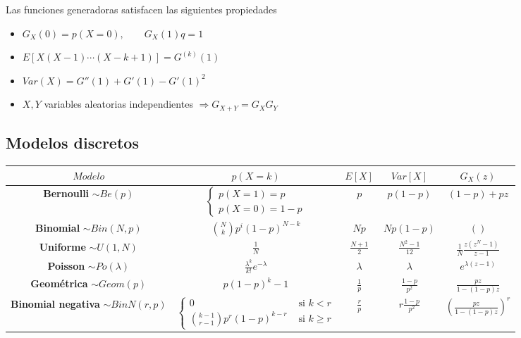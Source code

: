 \documentclass[leqno]{article}
\begin{document}
Las funciones generadoras satisfacen las siguientes propiedades
\begin{itemize}[topsep=-6pt, itemsep=0pt]
  \item $G_X(0) = p(X=0), \qquad G_X(1)q = 1$
  \item $E[X(X-1)\cdots (X-k+1)] =G^{(k)}(1)$ 
  \item $Var(X) = G''(1)+G'(1)-G'(1)^2$ 
  \item $X, Y$ variables aleatorias independientes  $\Rightarrow G_{X+Y} = G_XG_Y$
\end{itemize}

\subsection{Modelos discretos}
\begin{center}
\begin{tabular}{|c|c|c|c|c|}
\hline
$Modelo$ &  $p(X=k)$ &  $E[X]$ &  $Var[X]$ &  $G_X(z)$ \\
\hline
\makecell{\textbf{Bernoulli}\\ $\sim Be(p)$ }  & $\begin{cases}  p(X=1)=p \\  p(X=0) = 1-p \end{cases}$ & $p$ &  $p(1-p)$ &  $(1-p) + pz$ \\
\hline
\makecell{\textbf{Binomial}\\ $\sim Bin(N, p)$} & $\displaystyle\binom{N}{k}p^i(1-p)^{N-k}$ & $Np$ &  $Np(1-p)$ &  $()$ \\
\hline
\makecell{\textbf{Uniforme} \\ $\sim U(1, N)$} &  $\displaystyle\frac{1}{N}$ & $\displaystyle\frac{N+1}{2}$ & $\displaystyle\frac{N^2-1}{12}$ & $\displaystyle\frac{1}{N} \frac{z(z^N-1)}{z-1}$ \\
\hline
\makecell{\textbf{Poisson} \\ $\sim Po(\lambda)$} & $\displaystyle\frac{\lambda^k}{k!}e^{-\lambda}$ & $\lambda$ & $\lambda$ & $\displaystyle e^{\lambda(z-1)}$ \\
\hline
\makecell{\textbf{Geométrica} \\ $\sim Geom(p)$} & $\displaystyle p(1-p)^k-1$ &  $\displaystyle\frac{1}{p}$ &  $\displaystyle\frac{1-p}{p^2}$ &  $\displaystyle \frac{pz}{1-(1-p)z}$ \\
\hline
\makecell{\textbf{Binomial negativa} \\ $\sim BinN(r, p)$} & $\begin{cases} 0 & \text{ si } k<r \\ \binom{k-1}{r-1}p^r(1-p)^{k-r} & \text{ si } k\ge r \end{cases}$ & $\displaystyle\frac{r}{p}$ & $\displaystyle r \frac{1-p}{p^2}$ & $\displaystyle \left( \frac{pz}{1-(1-p)z} \right)^r $ \\
\hline
\end{tabular}
\end{center}
\end{document}
